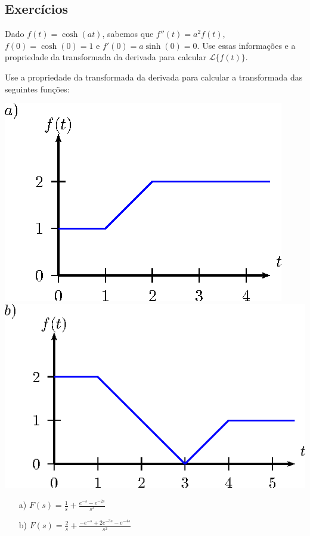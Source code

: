 \subsection*{Exercícios}
\begin{exer}
Dado $f(t)=\cosh(at)$, sabemos que $f''(t)=a^2f(t)$, $f(0)=\cosh(0)=1$ e $f'(0)=a\sinh(0)=0$. Use essas informações e a propriedade da transformada da derivada para calcular $\mathcal{L}\{f(t)\}$.
\end{exer}
\begin{exer} Use a propriedade da transformada da derivada para calcular a transformada das seguintes funções:
\begin{center}

\includegraphics{cap_linear_deriva/pics/figura_1}
\includegraphics{cap_linear_deriva/pics/figura_2}\end{center}
\end{exer}
\begin{resp}
 \begin{itemize}
  \item[a)] $F(s)=\frac{1}{s}+\frac{e^{-s}-e^{-2s}}{s^2}$
      \item[b)] $F(s)=\frac{2}{s}+\frac{-e^{-s}+2e^{-3s}-e^{-4s}}{s^2}$
 \end{itemize}
\end{resp}
